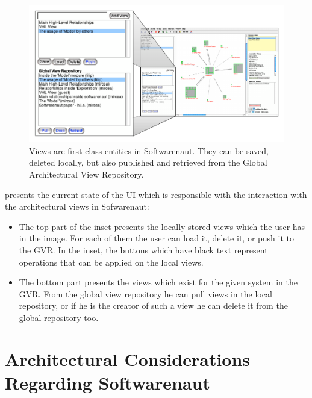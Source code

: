 \documentclass[preprint,12pt]{elsarticle}
\begin{document}
\begin{figure}[ht]
\begin{center}
\includegraphics[width=1.05\linewidth]{ViewOperations}
\caption{Views are first-class entities in Softwarenaut. They can be saved, deleted locally, but also published and retrieved from the Global Architectural View Repository.}
\end{center}
\end{figure}

 presents the current state of the UI which is responsible with the interaction with the architectural views in Sofwarenaut: 

\begin{itemize}

\item The top part of the inset presents the locally stored views which the user has in the image. For each of them the user can load it, delete it, or push it to the GVR. In the inset, the buttons which have black text represent operations that can be applied on the local views.

\item The bottom part presents the views which exist for the given system in the GVR. From the global view repository he can pull views in the local repository, or if he is the creator of such a view he can delete it from the global repository too. 

\end{itemize}


\section {Architectural Considerations Regarding Softwarenaut} 
\end{document}
